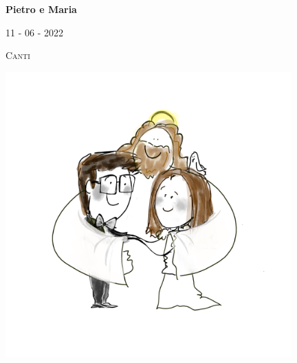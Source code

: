 %
%
%
%

\begin{titlepage}
	 \begin{center}
	 	{\ttfamily\huge\bfseries Pietro e Maria\par}
		{\ttfamily\scshape\Large 11 - 06 - 2022\par}
    {\ttfamily\scshape\normalsize Canti\par}
		\includegraphics[width=11cm]{img/DMP}\\ %
	\end{center}
\end{titlepage}

